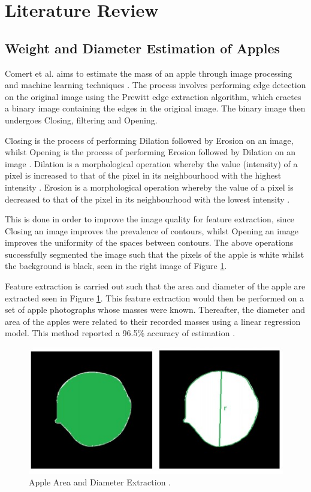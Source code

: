 \documentclass[conference]{IEEEtran}
\begin{document}
\section{Literature Review}
\subsection{Weight and Diameter Estimation of Apples}
Comert et al. aims to estimate the mass of an apple through image processing and machine learning techniques \cite{comert}.
The process involves performing edge detection on the original image using the Prewitt edge extraction algorithm, which craetes a binary image containing the edges in the original image.
The binary image then undergoes Closing, filtering and Opening.

Closing is the process of performing Dilation followed by Erosion on an image, whilst Opening is the process of performing Erosion followed by Dilation on an image \cite{opening,closing}.
Dilation is a morphological operation whereby the value (intensity) of a pixel is increased to that of the pixel in its neighbourhood with the highest intensity \cite{mathworksdilationerosion}.
Erosion is a morphological operation whereby the value of a pixel is decreased to that of the pixel in its neighbourhood with the lowest intensity \cite{mathworksdilationerosion}.

This is done in order to improve the image quality for feature extraction, since Closing an image improves the prevalence of contours, whilst Opening an image improves the uniformity of the spaces between contours.
The above operations successfully segmented the image such that the pixels of the apple is white whilst the background is black, seen in the right image of Figure \ref{fig:diameterapples}.

Feature extraction is carried out such that the area and diameter of the apple are extracted seen in Figure \ref{fig:diameterapples}.
This feature extraction would then be performed on a set of apple photographs whose masses were known.
Thereafter, the diameter and area of the apples were related to their recorded masses using a linear regression model.
This method reported a 96.5\% accuracy of estimation \cite{comert}.

\begin{figure}
    \centering
    \includegraphics[width=0.7\linewidth]{diameterapples.jpg}
    \caption{Apple Area and Diameter Extraction  \cite{comert}.}
    \label{fig:diameterapples}
\end{figure}
\end{document}
